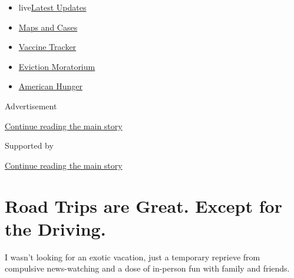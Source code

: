 \begin{itemize}
\tightlist
\item
  live\href{https://www.nytimes3xbfgragh.onion/2020/09/08/world/covid-19-coronavirus.html?name=styln-coronavirus-national\&region=TOP_BANNER\&block=storyline_menu_recirc\&action=click\&pgtype=Article\&impression_id=e7191880-f1ce-11ea-a9f5-3bb13a07ea98\&variant=undefined}{Latest
  Updates}
\item
  \href{https://www.nytimes3xbfgragh.onion/interactive/2020/us/coronavirus-us-cases.html?name=styln-coronavirus-national\&region=TOP_BANNER\&block=storyline_menu_recirc\&action=click\&pgtype=Article\&impression_id=e7191881-f1ce-11ea-a9f5-3bb13a07ea98\&variant=undefined}{Maps
  and Cases}
\item
  \href{https://www.nytimes3xbfgragh.onion/interactive/2020/science/coronavirus-vaccine-tracker.html?name=styln-coronavirus-national\&region=TOP_BANNER\&block=storyline_menu_recirc\&action=click\&pgtype=Article\&impression_id=e7191882-f1ce-11ea-a9f5-3bb13a07ea98\&variant=undefined}{Vaccine
  Tracker}
\item
  \href{https://www.nytimes3xbfgragh.onion/2020/09/02/your-money/eviction-moratorium-covid.html?name=styln-coronavirus-national\&region=TOP_BANNER\&block=storyline_menu_recirc\&action=click\&pgtype=Article\&impression_id=e7191883-f1ce-11ea-a9f5-3bb13a07ea98\&variant=undefined}{Eviction
  Moratorium}
\item
  \href{https://www.nytimes3xbfgragh.onion/interactive/2020/09/02/magazine/food-insecurity-hunger-us.html?name=styln-coronavirus-national\&region=TOP_BANNER\&block=storyline_menu_recirc\&action=click\&pgtype=Article\&impression_id=e7191884-f1ce-11ea-a9f5-3bb13a07ea98\&variant=undefined}{American
  Hunger}
\end{itemize}

Advertisement

\protect\hyperlink{after-top}{Continue reading the main story}

Supported by

\protect\hyperlink{after-sponsor}{Continue reading the main story}

\hypertarget{road-trips-are-great-except-for-the-driving}{%
\section{Road Trips are Great. Except for the
Driving.}\label{road-trips-are-great-except-for-the-driving}}

I wasn't looking for an exotic vacation, just a temporary reprieve from
compulsive news-watching and a dose of in-person fun with family and
friends.

